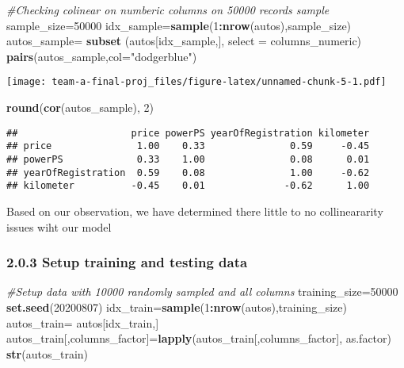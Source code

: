 \documentclass[]{article}
\newenvironment{Shaded}{\begin{snugshade}}{\end{snugshade}}
\newcommand{\CommentTok}[1]{\textcolor[rgb]{0.56,0.35,0.01}{\textit{#1}}}
\newcommand{\DataTypeTok}[1]{\textcolor[rgb]{0.13,0.29,0.53}{#1}}
\newcommand{\DecValTok}[1]{\textcolor[rgb]{0.00,0.00,0.81}{#1}}
\newcommand{\KeywordTok}[1]{\textcolor[rgb]{0.13,0.29,0.53}{\textbf{#1}}}
\newcommand{\NormalTok}[1]{#1}
\newcommand{\OperatorTok}[1]{\textcolor[rgb]{0.81,0.36,0.00}{\textbf{#1}}}
\newcommand{\StringTok}[1]{\textcolor[rgb]{0.31,0.60,0.02}{#1}}
\begin{document}
\begin{Shaded}
\begin{Highlighting}[]
\CommentTok{#Checking colinear on numberic columns on 50000 records sample}
\NormalTok{sample_size=}\DecValTok{50000}
\NormalTok{idx_sample=}\KeywordTok{sample}\NormalTok{(}\DecValTok{1}\OperatorTok{:}\KeywordTok{nrow}\NormalTok{(autos),sample_size)}
\NormalTok{autos_sample=}\StringTok{ }\KeywordTok{subset}\NormalTok{ (autos[idx_sample,], }\DataTypeTok{select =}\NormalTok{ columns_numeric) }
\KeywordTok{pairs}\NormalTok{(autos_sample,}\DataTypeTok{col=}\StringTok{"dodgerblue"}\NormalTok{)}
\end{Highlighting}
\end{Shaded}

\texttt{[image: team-a-final-proj\_files/figure-latex/unnamed-chunk-5-1.pdf]}

\begin{Shaded}
\begin{Highlighting}[]
\KeywordTok{round}\NormalTok{(}\KeywordTok{cor}\NormalTok{(autos_sample), }\DecValTok{2}\NormalTok{)}
\end{Highlighting}
\end{Shaded}

\begin{verbatim}
##                    price powerPS yearOfRegistration kilometer
## price               1.00    0.33               0.59     -0.45
## powerPS             0.33    1.00               0.08      0.01
## yearOfRegistration  0.59    0.08               1.00     -0.62
## kilometer          -0.45    0.01              -0.62      1.00
\end{verbatim}

Based on our observation, we have determined there little to no
collineararity issues wiht our model

\hypertarget{setup-training-and-testing-data}{%
\subsubsection{2.0.3 Setup training and testing
data}\label{setup-training-and-testing-data}}

\begin{Shaded}
\begin{Highlighting}[]
\CommentTok{#Setup data with 10000 randomly sampled and all columns}
\NormalTok{training_size=}\DecValTok{50000}
\KeywordTok{set.seed}\NormalTok{(}\DecValTok{20200807}\NormalTok{)}
\NormalTok{idx_train=}\KeywordTok{sample}\NormalTok{(}\DecValTok{1}\OperatorTok{:}\KeywordTok{nrow}\NormalTok{(autos),training_size)}
\NormalTok{autos_train=}\StringTok{ }\NormalTok{autos[idx_train,]}
\NormalTok{autos_train[,columns_factor]=}\KeywordTok{lapply}\NormalTok{(autos_train[,columns_factor], as.factor)}
\KeywordTok{str}\NormalTok{(autos_train)}
\end{Highlighting}
\end{Shaded}
\end{document}
